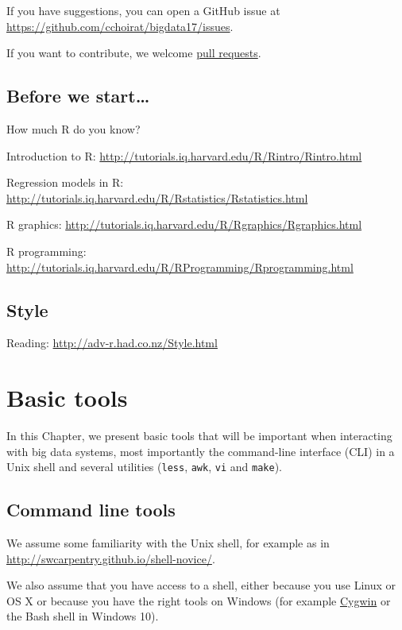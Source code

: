 \documentclass[]{book}
\theoremstyle{definition}
\theoremstyle{definition}
\theoremstyle{definition}
\theoremstyle{remark}
\begin{document}
If you have suggestions, you can open a GitHub issue at
\url{https://github.com/cchoirat/bigdata17/issues}.

If you want to contribute, we welcome
\href{https://help.github.com/articles/about-pull-requests/}{pull
requests}.

\section{Before we start\ldots{}}\label{before-we-start}

How much R do you know?

Introduction to R:
\url{http://tutorials.iq.harvard.edu/R/Rintro/Rintro.html}

Regression models in R:
\url{http://tutorials.iq.harvard.edu/R/Rstatistics/Rstatistics.html}

R graphics:
\url{http://tutorials.iq.harvard.edu/R/Rgraphics/Rgraphics.html}

R programming:
\url{http://tutorials.iq.harvard.edu/R/RProgramming/Rprogramming.html}

\section{Style}\label{style}

Reading: \url{http://adv-r.had.co.nz/Style.html}

\chapter{Basic tools}\label{basics}

In this Chapter, we present basic tools that will be important when
interacting with big data systems, most importantly the command-line
interface (CLI) in a Unix shell and several utilities (\texttt{less},
\texttt{awk}, \texttt{vi} and \texttt{make}).

\section{Command line tools}\label{command-line-tools}

We assume some familiarity with the Unix shell, for example as in
\url{http://swcarpentry.github.io/shell-novice/}.

We also assume that you have access to a shell, either because you use
Linux or OS X or because you have the right tools on Windows (for
example \href{https://www.cygwin.com/}{Cygwin} or the Bash shell in
Windows 10).
\end{document}
